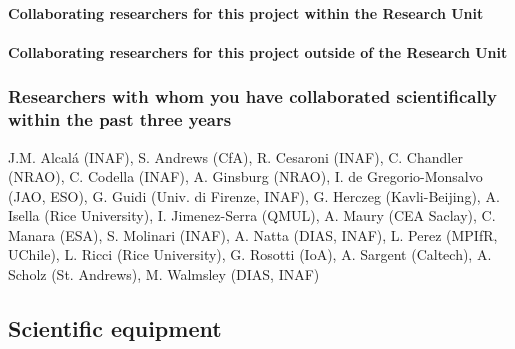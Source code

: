 \documentclass[10pt,fleqn,twoside]{article}
\begin{document}
\paragraph{Collaborating researchers for this project within the
  Research Unit}


\paragraph{Collaborating researchers for this project outside of
  the Research Unit}



\subsubsection{Researchers with whom you have collaborated scientifically within the past three years}


J.M. Alcal\'a (INAF), S. Andrews (CfA), R. Cesaroni (INAF), C. Chandler (NRAO), C. Codella (INAF), A. Ginsburg (NRAO), I. de Gregorio-Monsalvo (JAO, ESO), G. Guidi (Univ. di Firenze, INAF), G. Herczeg (Kavli-Beijing), A. Isella (Rice University), I. Jimenez-Serra (QMUL), A. Maury (CEA Saclay), C. Manara (ESA), S. Molinari (INAF), A. Natta (DIAS, INAF), L. Perez (MPIfR, UChile), L. Ricci (Rice University), G. Rosotti (IoA), A. Sargent (Caltech), A. Scholz (St. Andrews), M. Walmsley (DIAS, INAF)

\subsection{Scientific equipment}
\end{document}
